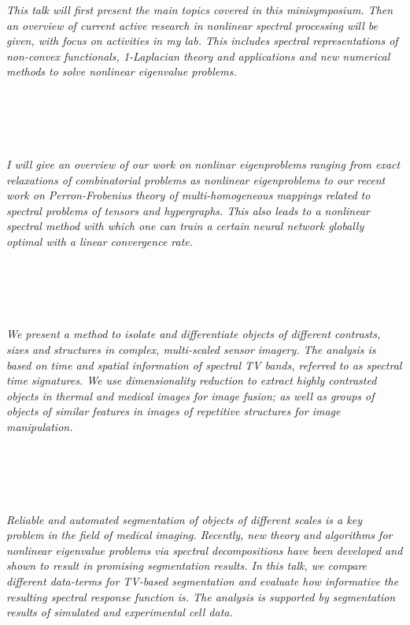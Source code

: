   \begin{multicols}{2}
      \textit{This talk will first present the main topics covered in this minisymposium. Then an overview of current active research in nonlinear spectral processing will be given, with focus on activities in my lab. This includes spectral representations of non-convex functionals, 1-Laplacian theory and applications and new numerical methods to solve nonlinear eigenvalue problems.  }\\
\\ 
        \\
        \\\\
\\
      \textit{I will give an overview of our work on nonlinar eigenproblems ranging from exact relaxations of combinatorial problems as nonlinear eigenproblems to our recent work on Perron-Frobenius theory of multi-homogeneous mappings related to spectral problems of tensors and hypergraphs. This also leads to a nonlinear spectral
method with which one can train a certain neural network globally optimal with a linear convergence rate.}\\
\\ 
        \\
        \\\\
\\
      \textit{We present a method to isolate and differentiate objects of different contrasts, sizes and structures in complex, multi-scaled sensor imagery. The analysis is based on time and spatial information of spectral TV bands, referred to as spectral time signatures. We use dimensionality reduction to extract highly contrasted objects in thermal and medical images for image fusion; as well as groups of objects of similar features in images of repetitive structures for image manipulation.  }\\
\\ 
        \\
        \\\\
\\
      \textit{Reliable and automated segmentation of objects of different scales is a key problem in the field of medical imaging. Recently, new theory and algorithms for nonlinear eigenvalue problems via spectral decompositions have been developed and shown to result in promising segmentation results. In this talk, we compare different data-terms for TV-based segmentation and evaluate how informative the resulting spectral response function is. The analysis is supported by segmentation results of simulated and experimental cell data.}\\
\\ 
        \\
        \\\\
\\
\end{multicols}
